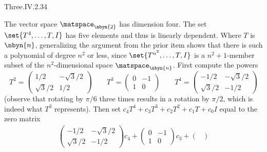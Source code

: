 \begin{ans}{Three.IV.2.34}
      \begin{exparts}
         \partsitem The vector space \( \matspace_{\nbyn{2}} \) has dimension
           four.
           The set \( \set{T^4,\dots,T,I} \) has five
           elements and thus is linearly dependent.
         \partsitem Where \( T \) is \( \nbyn{n} \),
           generalizing the argument from the
           prior item shows that there is such a polynomial of degree
           \( n^2 \) or less,
           since \( \set{T^{n^2},\dots,T,I} \) is a \( n^2+1 \)-member
           subset of the $n^2$-dimensional space $\matspace_{\nbyn{n}}$.
         \partsitem First compute the powers
           \begin{equation*}
              T^2=
              \begin{pmatrix}
                 1/2         &-\sqrt{3}/2  \\
                 \sqrt{3}/2  &1/2
              \end{pmatrix}
              \qquad
              T^3=
              \begin{pmatrix}
                 0           &-1           \\
                 1           &0
              \end{pmatrix}
             \qquad
              T^4=
              \begin{pmatrix}
                 -1/2        &-\sqrt{3}/2  \\
                 \sqrt{3}/2  &-1/2
              \end{pmatrix}
           \end{equation*}
           (observe that rotating by $\pi/6$ three times results in a
           rotation by $\pi/2$, which is indeed what $T^3$ represents).
           Then set \( c_4T^4+c_3T^3+c_2T^2+c_1T+c_0I \)
           equal to the zero matrix
           \begin{multline*}
             \begin{pmatrix}
                 -1/2        &-\sqrt{3}/2  \\
                 \sqrt{3}/2  &-1/2
              \end{pmatrix}c_4
              +\begin{pmatrix}
                 0           &-1           \\
                 1           &0
              \end{pmatrix}c_3
              +\begin{pmatrix}

\end{pmatrix}
\end{multline*}
\end{exparts}
\end{ans}
